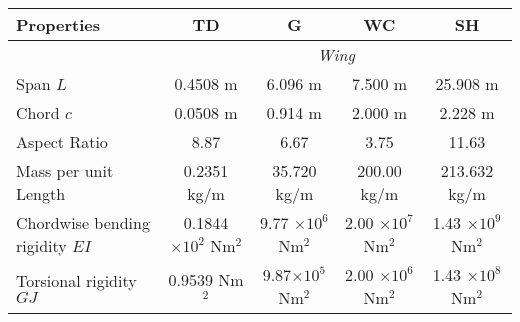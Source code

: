 \documentclass{standalone}
\begin{document}
    \centering
    \begin{tabular}{l c c c c}
    \toprule
    \toprule
    Properties&TD&G&WC&SH\\
    \midrule
    &\multicolumn{4}{c}{\textit{Wing}}\\
    Span $L$    & 0.4508 m & 6.096 m & 7.500 m & 25.908 m  \\
    Chord $c$   & 0.0508 m & 0.914 m & 2.000 m & 2.228 m \\ 
    Aspect Ratio & 8.87 & 6.67 & 3.75 & 11.63 \\
    Mass per unit Length     & 0.2351 kg/m & 35.720 kg/m & 200.00 kg/m & 213.632 kg/m\\
     Chordwise bending rigidity $EI$  & 0.1844 $\times 10^2$ Nm$^2$ & 9.77 $\times 10^6$ Nm$^2$ & 2.00 $\times 10^7$ Nm$^2$ & 1.43 $\times 10^9$ Nm$^2$\\
    Torsional rigidity $GJ$ & 0.9539 Nm$^2$ & 9.87$\times 10^5$ Nm$^2$ & 2.00 $\times 10^6$ Nm$^2$ & 1.43 $\times 10^8$ Nm$^2$\\
    \bottomrule
    \bottomrule
    \end{tabular}
    
\end{document}
